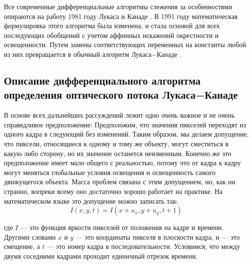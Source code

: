 Все современные дифференциальные алгоритмы слежения за особенностями опираются на работу 1981 году Лукаса и Канаде \cite{lyka_kan}. В 1991 году математическая формулировка этого алгоритма была изменена, и стала основой для всех последующих обобщений с учетом аффинных искажений окрестности и освещенности. Путем замены соответствующих переменных на константы любой из них превращается в обычный алгоритм Лукаса−Канаде \cite{lk_jou}.


\subsection{Описание дифференциального алгоритма определения оптического потока Лукаса−Канаде}

В основе всех дальнейших рассуждений лежит одно очень важное и не очень справедливое предположение: Предположим, что значения пикселей переходят из одного кадра в следующий без изменений. Таким образом, мы делаем допущение, что пиксели, относящиеся к одному и тому же объекту, могут сместиться в какую либо сторону, но их значение останется неизменным. Конечно же это предположение имеет мало общего с реальностью, потому что от кадра к кадру могут меняться глобальные условия освещения и освещенность самого движущегося объекта. Масса проблем связана с этим допущением, но, как ни странно, вопреки всему оно достаточно хорошо работает на практике. На математическом языке это допущение можно записать так:
\label{eq:f_0}
\begin{equation}
I(x,y,t)=I(x+u_x,y+u_y,t+1)
\end{equation}

где $I$ — это функция яркости пикселей от положения на кадре и времени. Другими словами $x$ и $y$ — это координаты пикселя в плоскости кадра, и — это смещение, а $t$ — это номер кадра в последовательности. Условимся, что между двумя соседними кадрами проходит единичный отрезок времени.

